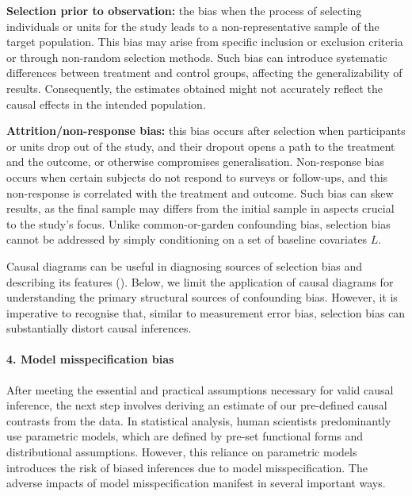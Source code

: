 \documentclass[
  singlecolumn,
  9pt]{article}
\let\oldparagraph\paragraph
\renewcommand{\paragraph}[1]{\oldparagraph{#1}\mbox{}}
\begin{document}
\textbf{Selection prior to observation:} the bias when the process of
selecting individuals or units for the study leads to a
non-representative sample of the target population. This bias may arise
from specific inclusion or exclusion criteria or through non-random
selection methods. Such bias can introduce systematic differences
between treatment and control groups, affecting the generalizability of
results. Consequently, the estimates obtained might not accurately
reflect the causal effects in the intended population.

\textbf{Attrition/non-response bias:} this bias occurs after selection
when participants or units drop out of the study, and their dropout
opens a path to the treatment and the outcome, or otherwise compromises
generalisation. Non-response bias occurs when certain subjects do not
respond to surveys or follow-ups, and this non-response is correlated
with the treatment and outcome. Such bias can skew results, as the final
sample may differs from the initial sample in aspects crucial to the
study's focus. Unlike common-or-garden confounding bias, selection bias
cannot be addressed by simply conditioning on a set of baseline
covariates \(L\).

Causal diagrams can be useful in diagnosing sources of selection bias
and describing its features ().
Below, we limit the application of causal diagrams for understanding the
primary structural sources of confounding bias. However, it is
imperative to recognise that, similar to measurement error bias,
selection bias can substantially distort causal inferences.

\paragraph{4. Model misspecification
bias}\label{model-misspecification-bias}

After meeting the essential and practical assumptions necessary for
valid causal inference, the next step involves deriving an estimate of
our pre-defined causal contrasts from the data. In statistical analysis,
human scientists predominantly use parametric models, which are defined
by pre-set functional forms and distributional assumptions. However,
this reliance on parametric models introduces the risk of biased
inferences due to model misspecification. The adverse impacts of model
misspecification manifest in several important ways.
\end{document}
